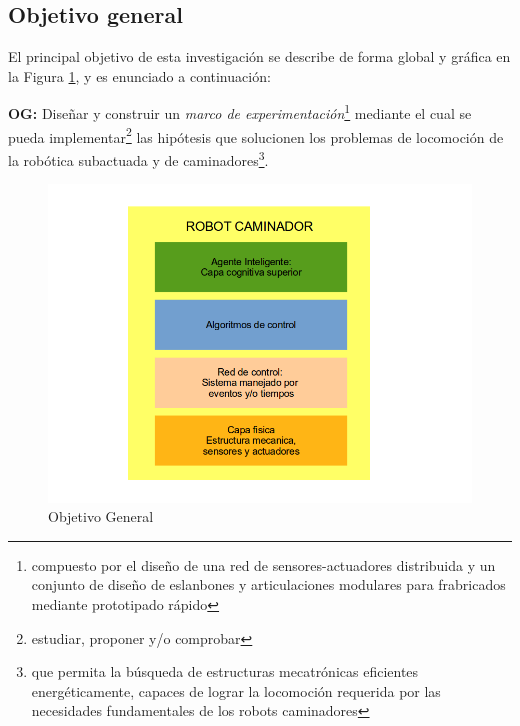 \documentclass[12pt,twoside,onecolumn,letterpaper]{article}
\begin{document}
\subsection{Objetivo general}
\label{sec:objgen}
El principal objetivo de esta investigaci\'on se describe de forma global y gr\'afica en la Figura \ref{fig:objGen}, y es enunciado a continuaci\'on:\par
\textbf{OG:} Dise\~nar y construir un \emph{marco de experimentaci\'on}\footnote{compuesto por el dise\~no de una red de sensores-actuadores distribuida y un conjunto de dise\~no de eslanbones y articulaciones modulares para frabricados mediante prototipado r\'apido} mediante el cual se pueda implementar\footnote{estudiar, proponer y/o comprobar} las hip\'otesis que solucionen los problemas de locomoci\'on de la rob\'otica subactuada y de caminadores\footnote{que permita la b\'usqueda de estructuras mecatr\'onicas eficientes energ\'eticamente, capaces de lograr la locomoci\'on requerida por las necesidades fundamentales de los robots caminadores}.\par
\begin{figure}[!htb]
  \centering
  \includegraphics[scale=0.5]{../images/objGen.png}
  \caption{Objetivo General}
  \label{fig:objGen}
\end{figure}
\end{document}
